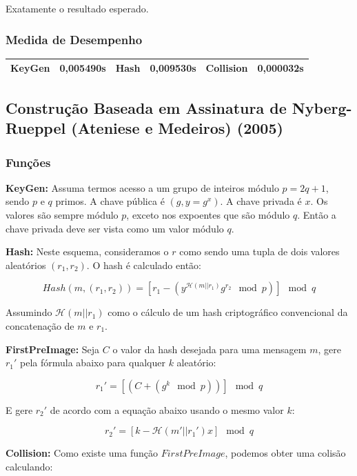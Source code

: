 \documentclass[a4paper]{article}
\begin{document}
Exatamente o resultado esperado.

\subsubsection{Medida de Desempenho}

\begin{center}
\begin{tabular}{|c|c|c|c|c|c|}
  \hline
  KeyGen & 0,005490s & Hash & 0,009530s & Collision & 0,000032s\\
  \hline
\end{tabular}
\end{center}

\subsection{Construção Baseada em Assinatura de Nyberg-Rueppel (Ateniese e Medeiros) (2005)\cite{ateniese}}

\subsubsection{Funções}

\textbf{KeyGen: }Assuma termos acesso a um grupo de inteiros módulo
$p=2q+1$, sendo $p$ e $q$ primos. A chave pública é $(g, y=g^x)$. A
chave privada é $x$. Os valores são sempre módulo $p$, exceto nos
expoentes que são módulo $q$. Então a chave privada deve ser vista
como um valor módulo $q$.

\textbf{Hash: }Neste esquema, consideramos o $r$ como sendo uma tupla
de dois valores aleatórios $(r_1, r_2)$. O hash é calculado então:

$$ Hash(m, (r_1, r_2)) = \left[r_1-(y^{\mathcal{H}(m||r_1)}g^{r_2}
  \mod p)\right] \mod q
$$

Assumindo $\mathcal{H}(m||r_1)$ como o cálculo de um hash
criptográfico convencional da concatenação de $m$ e $r_1$.

\textbf{FirstPreImage:} Seja $C$ o valor da hash desejada para uma
mensagem $m$, gere $r_1'$ pela fórmula abaixo para qualquer $k$
aleatório:

$$
r_1' = \left[(C + (g^k \mod p))\right] \mod q
$$

E gere $r_2'$ de acordo com a equação abaixo usando o mesmo valor $k$:

$$
r_2' = \left[k-\mathcal{H}(m'||r_1')x\right] \mod q
$$

\textbf{Collision:} Como existe uma função $FirstPreImage$, podemos
obter uma colisão calculando:
\end{document}
